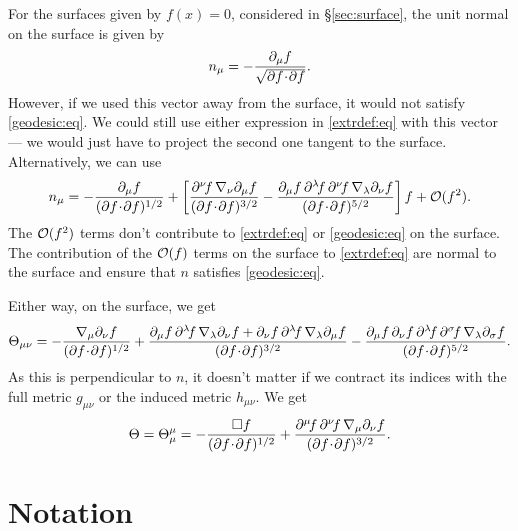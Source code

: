 \documentclass[12pt]{article}
\begin{document}
For the surfaces given by $f(x)=0$, considered in \S\ref{sec:surface}, the unit normal on the surface is given by
%
\begin{equation}\label{normonsurf:eq}
  n_\mu = -\frac{\partial_\mu f}{\sqrt{\partial f \!\cdot\! \partial f}}.
\end{equation}
%
However, if we used this vector away from the surface, it would not satisfy \eqref{geodesic:eq}. We could still use either expression in \eqref{extrdef:eq} with this vector --- we would just have to project the second one tangent to the surface. Alternatively, we can use
%
\begin{equation}\label{normoffsurf:eq}
  n_\mu = -\frac{\p_\mu f}{(\p f \cdt \p f)^{1/2}}
   +\brk{ \frac{\p^\nu\! f\, \nabla_\nu \p_\mu f}{(\p f \cdt \p f)^{3/2}}
      - \frac{\p_\mu f\, \p^\lambda\! f\, \p^\nu\! f\, \nabla_\lambda \p_\nu f}{(\p f \cdt \p f)^{5/2}} } f
   + \CO(f^2).
\end{equation}
%
The $\mathcal{O}(f^2)$ terms don't contribute to \eqref{extrdef:eq} or \eqref{geodesic:eq} on the surface. The contribution of the $\mathcal{O}(f)$ terms on the surface to \eqref{extrdef:eq} are normal to the surface and ensure that $n$ satisfies \eqref{geodesic:eq}.

Either way, on the surface, we get
%
\begin{equation}\label{extrsurf:eq}
  \Theta_{\mu\nu} = -\frac{\nabla_\mu \p_\nu f}{(\p f \cdt \p f)^{1/2}}
    + \frac{\p_\mu f\, \p^\lambda\! f\, \nabla_\lambda \p_\nu f + \p_\nu f\, \p^\lambda\! f\, \nabla_\lambda \p_\mu f}
           {(\p f \cdt \p f)^{3/2}}
    - \frac{\p_\mu f\, \p_\nu f\, \p^\lambda\! f\, \p^\sigma\! f\, \nabla_\lambda \p_\sigma f}
           {(\p f \cdt \p f)^{5/2}}.
\end{equation}
%
As this is perpendicular to $n$, it doesn't matter if we contract its indices with the full metric $g_{\mu\nu}$ or the induced metric $h_{\mu\nu}$. We get
%
\begin{equation}\label{trextrsurf:eq}
  \Theta = \Theta_\mu^\mu = -\frac{\square f}{(\partial f \!\cdot\! \partial f)^{1/2}}
    + \frac{\partial^\mu\! f\, \partial^\nu\! f\, \nabla_\mu \partial_\nu f}
           {(\partial f \!\cdot\! \partial f)^{3/2}}.
\end{equation}
%

\section{Notation}\label{app:notation}
\end{document}
